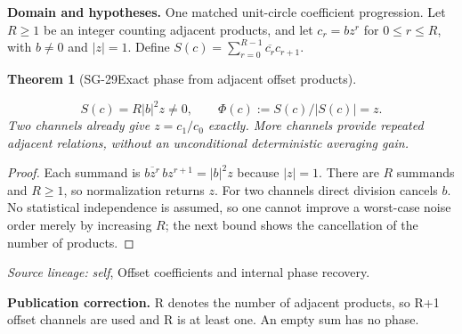 \documentclass[11pt]{article}
\newtheorem{theorem}{Theorem}[section]
\theoremstyle{definition}\newtheorem{definition}[theorem]{Definition}
\theoremstyle{remark}\newtheorem{remark}[theorem]{Remark}
\begin{document}
\par{\small\textbf{Domain and hypotheses.} One matched unit-circle coefficient progression. Let $R\ge1$ be an integer counting adjacent products, and let $c_r=bz^r$ for $0\le r\le R$, with $b\ne0$ and $|z|=1$. Define $S(c)=\sum_{r=0}^{R-1}\overline{c_r}c_{r+1}$.}\par
\begin{theorem}[SG-29\quad Exact phase from adjacent offset products]\label{SG-29}

\[
 S(c)=R|b|^2z\ne0,\qquad\Phi(c):=S(c)/|S(c)|=z.
\]
Two channels already give $z=c_1/c_0$ exactly. More channels provide repeated
adjacent relations, without an unconditional deterministic averaging gain.

\end{theorem}
\begin{proof}

Each summand is
$\overline{bz^r}\,bz^{r+1}=|b|^2z$ because $|z|=1$.
There are $R$ summands and $R\ge1$, so normalization returns $z$.
For two channels direct division cancels $b$. No statistical independence is
assumed, so one cannot improve a worst-case noise order merely by increasing
$R$; the next bound shows the cancellation of the number of products.

\end{proof}

\par{\small\color{Teal}\textit{Source lineage:} \textit{self}, Offset coefficients and internal phase recovery.}\par

\par{\small\textbf{Publication correction.} R denotes the number of adjacent products, so R+1 offset channels are used and R is at least one. An empty sum has no phase.}\par
\end{document}
